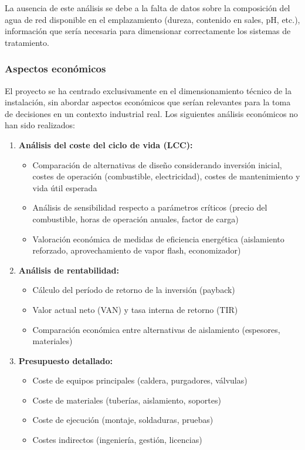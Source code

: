 La ausencia de este análisis se debe a la falta de datos sobre la composición del agua de red disponible en el emplazamiento (dureza, contenido en sales, pH, etc.), información que sería necesaria para dimensionar correctamente los sistemas de tratamiento.

\subsubsection{Aspectos económicos}
\label{subsubsec:limitaciones-economicos}

El proyecto se ha centrado exclusivamente en el dimensionamiento técnico de la instalación, sin abordar aspectos económicos que serían relevantes para la toma de decisiones en un contexto industrial real. Los siguientes análisis económicos no han sido realizados:

\begin{enumerate}[label=\arabic*., leftmargin=2em]
	\item \textbf{Análisis del coste del ciclo de vida (LCC):}
	      \begin{itemize}[noitemsep]
		      \item Comparación de alternativas de diseño considerando inversión inicial, costes de operación (combustible, electricidad), costes de mantenimiento y vida útil esperada
		      \item Análisis de sensibilidad respecto a parámetros críticos (precio del combustible, horas de operación anuales, factor de carga)
		      \item Valoración económica de medidas de eficiencia energética (aislamiento reforzado, aprovechamiento de vapor flash, economizador)
	      \end{itemize}

	\item \textbf{Análisis de rentabilidad:}
	      \begin{itemize}[noitemsep]
		      \item Cálculo del período de retorno de la inversión (payback)
		      \item Valor actual neto (VAN) y tasa interna de retorno (TIR)
		      \item Comparación económica entre alternativas de aislamiento (espesores, materiales)
	      \end{itemize}

	\item \textbf{Presupuesto detallado:}
	      \begin{itemize}[noitemsep]
		      \item Coste de equipos principales (caldera, purgadores, válvulas)
		      \item Coste de materiales (tuberías, aislamiento, soportes)
		      \item Coste de ejecución (montaje, soldaduras, pruebas)
		      \item Costes indirectos (ingeniería, gestión, licencias)
	      \end{itemize}
\end{enumerate}

